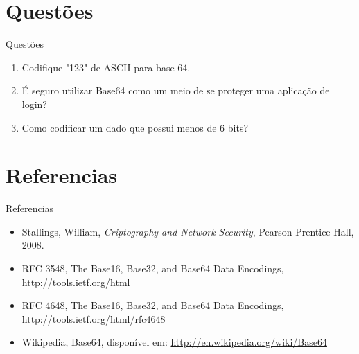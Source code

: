 \documentclass[pdf]{beamer}
\begin{document}
\section{Questões}
\begin{frame}{Questões}
\transdissolve
\begin{enumerate}
\item Codifique "123" de ASCII para base 64.
\item É seguro utilizar Base64 como um meio de se proteger uma aplicação de login?
\item Como codificar um dado que possui menos de 6 bits?
\end{enumerate}
\end{frame}
\section{Referencias}
\begin{frame}{Referencias}
\begin{itemize}
\item Stallings, William, \emph{ Criptography and Network Security}, Pearson Prentice Hall, 2008.
\item RFC 3548, The Base16, Base32, and Base64 Data Encodings, \url{http://tools.ietf.org/html}
\item RFC 4648, The Base16, Base32, and Base64 Data Encodings, \url{http://tools.ietf.org/html/rfc4648}
\item Wikipedia, Base64, disponível em: \url{http://en.wikipedia.org/wiki/Base64}
\end{itemize}
\end{frame}
\end{document}
